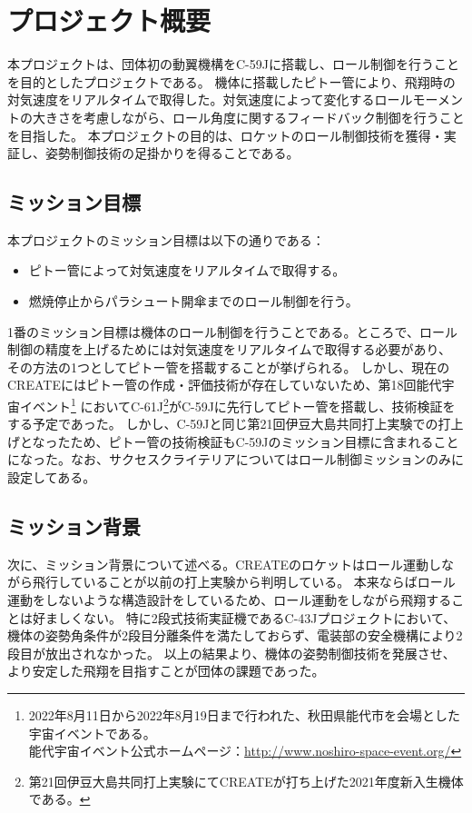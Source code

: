 \documentclass[a4paper,11pt,titlepage,uplatex]{jsarticle}
\begin{document}
\section{プロジェクト概要}
本プロジェクトは、団体初の動翼機構をC-59Jに搭載し、ロール制御を行うことを目的としたプロジェクトである。
機体に搭載したピトー管により、飛翔時の対気速度をリアルタイムで取得した。対気速度によって変化するロールモーメントの大きさを考慮しながら、ロール角度に関するフィードバック制御を行うことを目指した。
本プロジェクトの目的は、ロケットのロール制御技術を獲得・実証し、姿勢制御技術の足掛かりを得ることである。

\subsection{ミッション目標}
本プロジェクトのミッション目標は以下の通りである：
\begin{itemize}
    \item ピトー管によって対気速度をリアルタイムで取得する。
    \item 燃焼停止からパラシュート開傘までのロール制御を行う。
\end{itemize}

1番のミッション目標は機体のロール制御を行うことである。ところで、ロール制御の精度を上げるためには対気速度をリアルタイムで取得する必要があり、
その方法の1つとしてピトー管を搭載することが挙げられる。
しかし、現在のCREATEにはピトー管の作成・評価技術が存在していないため、第18回能代宇宙イベント\footnote{2022年8月11日から2022年8月19日まで行われた、秋田県能代市を会場とした宇宙イベントである。\\
    能代宇宙イベント公式ホームページ：\url{http://www.noshiro-space-event.org/}}
においてC-61J\footnote{第21回伊豆大島共同打上実験にてCREATEが打ち上げた2021年度新入生機体である。}がC-59Jに先行してピトー管を搭載し、技術検証をする予定であった。
しかし、C-59Jと同じ第21回伊豆大島共同打上実験での打上げとなったため、ピトー管の技術検証もC-59Jのミッション目標に含まれることになった。なお、サクセスクライテリアについてはロール制御ミッションのみに設定してある。

\subsection{ミッション背景}
次に、ミッション背景について述べる。CREATEのロケットはロール運動しながら飛行していることが以前の打上実験から判明している。
本来ならばロール運動をしないような構造設計をしているため、ロール運動をしながら飛翔することは好ましくない。
特に2段式技術実証機であるC-43Jプロジェクトにおいて、機体の姿勢角条件が2段目分離条件を満たしておらず、電装部の安全機構により2段目が放出されなかった。
以上の結果より、機体の姿勢制御技術を発展させ、より安定した飛翔を目指すことが団体の課題であった。
\end{document}
